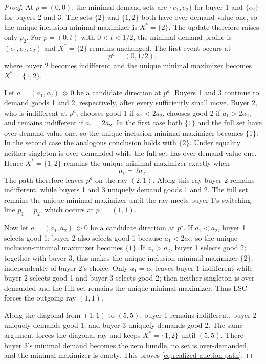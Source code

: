 \begin{proof}
At $p=(0,0)$, the minimal demand sets are $\{e_1,e_2\}$ for buyer 1 and $\{e_2\}$ for buyers 2 and 3. The sets $\{2\}$ and $\{1,2\}$ both have over-demand value one, so the unique inclusion-minimal maximizer is $X^*=\{2\}$. The update therefore raises only $p_2$. For $p=(0,t)$ with $0<t<1/2$, the minimal demand profile is $(e_1,e_2,e_2)$ and $X^*=\{2\}$ remains unchanged. The first event occurs at
\[
p^a=(0,1/2),
\]
where buyer 2 becomes indifferent and the unique minimal maximizer becomes $X^*=\{1,2\}$.

Let $a=(a_1,a_2)\gg0$ be a candidate direction at $p^a$. Buyers 1 and 3 continue to demand goods 1 and 2, respectively, after every sufficiently small move. Buyer 2, who is indifferent at $p^a$, chooses good 1 if $a_1<2a_2$, chooses good 2 if $a_1>2a_2$, and remains indifferent if $a_1=2a_2$. In the first case both $\{1\}$ and the full set have over-demand value one, so the unique inclusion-minimal maximizer becomes $\{1\}$. In the second case the analogous conclusion holds with $\{2\}$. Under equality neither singleton is over-demanded while the full set has over-demand value one. Hence $X^*=\{1,2\}$ remains the unique minimal maximizer exactly when
\[
a_1=2a_2.
\]
The path therefore leaves $p^a$ on the ray $(2,1)$. Along this ray buyer 2 remains indifferent, while buyers 1 and 3 uniquely demand goods 1 and 2. The full set remains the unique minimal maximizer until the ray meets buyer 1's switching line $p_1=p_2$, which occurs at $p^\circ=(1,1)$.

Now let $a=(a_1,a_2)\gg0$ be a candidate direction at $p^\circ$. If $a_1<a_2$, buyer 1 selects good 1; buyer 2 also selects good 1 because $a_1<2a_2$, so the unique inclusion-minimal maximizer becomes $\{1\}$. If $a_1>a_2$, buyer 1 selects good 2; together with buyer 3, this makes the unique inclusion-minimal maximizer $\{2\}$, independently of buyer 2's choice. Only $a_1=a_2$ leaves buyer 1 indifferent while buyer 2 selects good 1 and buyer 3 selects good 2; then neither singleton is over-demanded and the full set remains the unique minimal maximizer. Thus LSC forces the outgoing ray $(1,1)$.

Along the diagonal from $(1,1)$ to $(5,5)$, buyer 1 remains indifferent, buyer 2 uniquely demands good 1, and buyer 3 uniquely demands good 2. The same argument forces the diagonal ray and keeps $X^*=\{1,2\}$ until $(5,5)$. There buyer 3's minimal demand becomes the zero bundle, no set is over-demanded, and the minimal maximizer is empty. This proves \eqref{eq:realized-auction-path}.
\end{proof}

